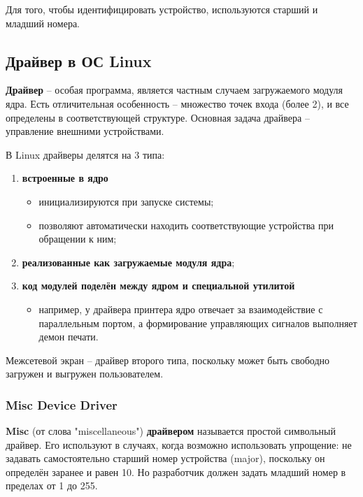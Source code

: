 Для того, чтобы идентифицировать устройство, используются старший и младший номера. \cite{os} \newline

\subsection{Драйвер в ОС Linux}
\textbf{Драйвер} -- особая программа, является частным случаем загружаемого модуля ядра.  Есть отличительная особенность -- множество точек входа (более 2), и все определены в соответствующей структуре. Основная задача драйвера -- управление внешними устройствами. \cite{os}

В Linux драйверы делятся на 3 типа:
\begin{enumerate}
	\item \textbf{встроенные в ядро}
	\begin{itemize}
		\item инициализируются при запуске системы;
		
		\item позволяют автоматически находить соответствующие устройства при обращении к ним;
	\end{itemize}
	
	\item \textbf{реализованные как загружаемые модуля ядра};
	
	\item \textbf{код модулей поделён между ядром и специальной утилитой}
	\begin{itemize}
		\item например, у драйвера принтера ядро отвечает за взаимодействие с параллельным портом, а формирование управляющих сигналов выполняет демон печати.
	\end{itemize}
\end{enumerate}

Межсетевой экран -- драйвер второго типа, поскольку может быть свободно загружен и выгружен пользователем. \newline

\subsubsection{Misc Device Driver}
\textbf{Misc} (от слова "miscellaneous") \textbf{драйвером} называется простой символьный драйвер. Его используют в случаях, когда возможно использовать упрощение: не задавать самостоятельно старший номер устройства (major), поскольку он определён заранее и равен 10. Но разработчик должен задать младший номер в пределах от 1 до 255. \cite{misc}

